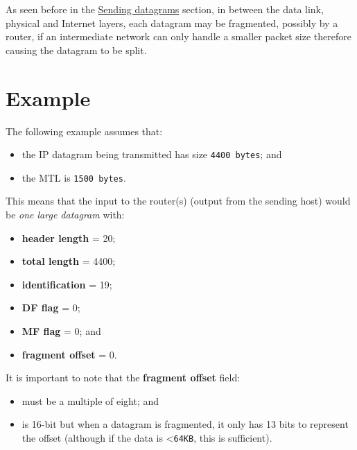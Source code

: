 \documentclass[a4paper]{systems-software}
\begin{document}
As seen before in the \hyperref[sec:sending_datagrams]{Sending datagrams} section, in between the data link, physical and Internet layers, each datagram may be fragmented, possibly by a router, if an intermediate network can only handle a smaller packet size therefore causing the datagram to be split.


\section*{Example}

The following example assumes that:
\begin{itemize}
	\item the IP datagram being transmitted has size \texttt{4400 bytes}; and
	\item the MTL is \texttt{1500 bytes}.
\end{itemize}

This means that the input to the router(s) (output from the sending host) would be \textit{one large datagram} with:
\begin{itemize}
	\item \textbf{header length} = 20;
	\item \textbf{total length} = 4400;
	\item \textbf{identification} = 19;
	\item \textbf{DF flag} = 0;
	\item \textbf{MF flag} = 0; and
	\item \textbf{fragment offset} = 0.
\end{itemize}

\newpage

It is important to note that the \textbf{fragment offset} field:
\begin{itemize}
	\item must be a multiple of eight; and
	\item is 16-bit but when a datagram is fragmented, it only has 13 bits to represent the offset (although if the data is <\texttt{64KB}, this is sufficient).
\end{itemize}
\end{document}
